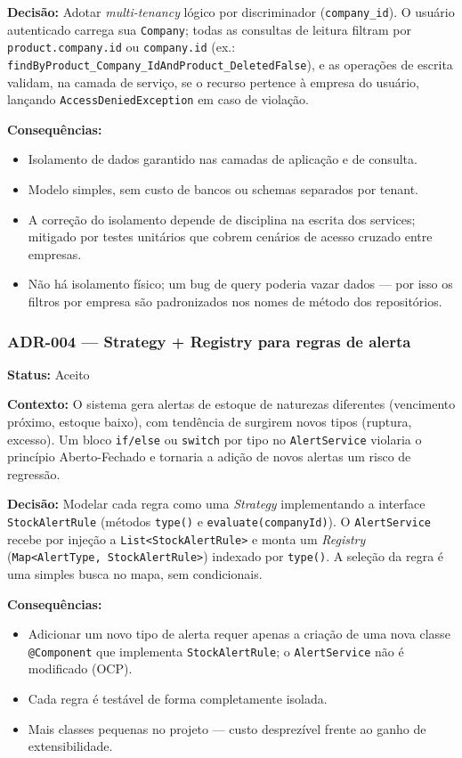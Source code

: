 \documentclass[12pt,a4paper]{article}
\begin{document}
\noindent\textbf{Decisão:}
Adotar \textit{multi-tenancy} lógico por discriminador (\texttt{company\_id}). O usuário autenticado carrega sua \texttt{Company}; todas as consultas de leitura filtram por \texttt{product.company.id} ou \texttt{company.id} (ex.: \texttt{findByProduct\_Company\_IdAndProduct\_DeletedFalse}), e as operações de escrita validam, na camada de serviço, se o recurso pertence à empresa do usuário, lançando \texttt{AccessDeniedException} em caso de violação.

\noindent\textbf{Consequências:}
\begin{itemize}
    \item[+] Isolamento de dados garantido nas camadas de aplicação e de consulta.
    \item[+] Modelo simples, sem custo de bancos ou schemas separados por tenant.
    \item[--] A correção do isolamento depende de disciplina na escrita dos services; mitigado por testes unitários que cobrem cenários de acesso cruzado entre empresas.
    \item[--] Não há isolamento físico; um bug de query poderia vazar dados — por isso os filtros por empresa são padronizados nos nomes de método dos repositórios.
\end{itemize}

\subsubsection{ADR-004 --- Strategy + Registry para regras de alerta}

\noindent\textbf{Status:} Aceito

\noindent\textbf{Contexto:}
O sistema gera alertas de estoque de naturezas diferentes (vencimento próximo, estoque baixo), com tendência de surgirem novos tipos (ruptura, excesso). Um bloco \texttt{if/else} ou \texttt{switch} por tipo no \texttt{AlertService} violaria o princípio Aberto-Fechado e tornaria a adição de novos alertas um risco de regressão.

\noindent\textbf{Decisão:}
Modelar cada regra como uma \textit{Strategy} implementando a interface \texttt{StockAlertRule} (métodos \texttt{type()} e \texttt{evaluate(companyId)}). O \texttt{AlertService} recebe por injeção a \texttt{List<StockAlertRule>} e monta um \textit{Registry} (\texttt{Map<AlertType, StockAlertRule>}) indexado por \texttt{type()}. A seleção da regra é uma simples busca no mapa, sem condicionais.

\noindent\textbf{Consequências:}
\begin{itemize}
    \item[+] Adicionar um novo tipo de alerta requer apenas a criação de uma nova classe \texttt{@Component} que implementa \texttt{StockAlertRule}; o \texttt{AlertService} não é modificado (OCP).
    \item[+] Cada regra é testável de forma completamente isolada.
    \item[--] Mais classes pequenas no projeto — custo desprezível frente ao ganho de extensibilidade.
\end{itemize}
\end{document}
